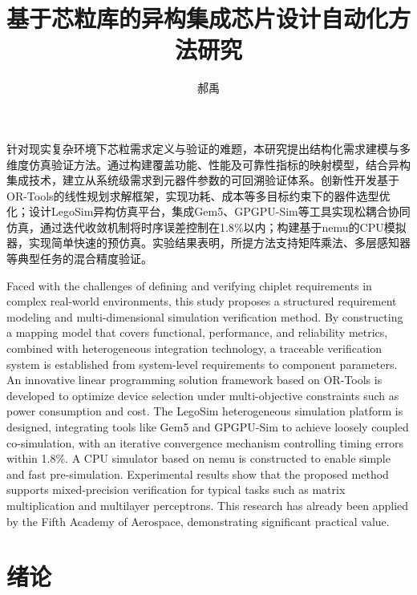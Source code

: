 \documentclass[bachelor]{thesis-uestc}
\title{基于芯粒库的异构集成芯片设计自动化方法研究}{The Time Marching Scheme of Time Domain
    Integral Equation and Corresponding Fast Algorithm}
\author{郝禹}{Wang Wen}
\begin{document}
\makecover

\begin{chineseabstract}
针对现实复杂环境下芯粒需求定义与验证的难题，本研究提出结构化需求建模与多维度仿真验证方法。通过构建覆盖功能、性能及可靠性指标的映射模型，结合异构集成技术，建立从系统级需求到元器件参数的可回溯验证体系。创新性开发基于OR-Tools的线性规划求解框架，实现功耗、成本等多目标约束下的器件选型优化；设计LegoSim异构仿真平台，集成Gem5、GPGPU-Sim等工具实现松耦合协同仿真，通过迭代收敛机制将时序误差控制在1.8\%以内；构建基于nemu的CPU模拟器，实现简单快速的预仿真。实验结果表明，所提方法支持矩阵乘法、多层感知器等典型任务的混合精度验证。


\end{chineseabstract}

\begin{englishabstract}
    Faced with the challenges of defining and verifying chiplet requirements in complex real-world environments, this study proposes a structured requirement modeling and multi-dimensional simulation verification method. By constructing a mapping model that covers functional, performance, and reliability metrics, combined with heterogeneous integration technology, a traceable verification system is established from system-level requirements to component parameters. An innovative linear programming solution framework based on OR-Tools is developed to optimize device selection under multi-objective constraints such as power consumption and cost. The LegoSim heterogeneous simulation platform is designed, integrating tools like Gem5 and GPGPU-Sim to achieve loosely coupled co-simulation, with an iterative convergence mechanism controlling timing errors within 1.8\%. A CPU simulator based on nemu is constructed to enable simple and fast pre-simulation. Experimental results show that the proposed method supports mixed-precision verification for typical tasks such as matrix multiplication and multilayer perceptrons. This research has already been applied by the Fifth Academy of Aerospace, demonstrating significant practical value.

\end{englishabstract}

\thesistableofcontents

\chapter{绪\hspace{6pt}论}
\end{document}
